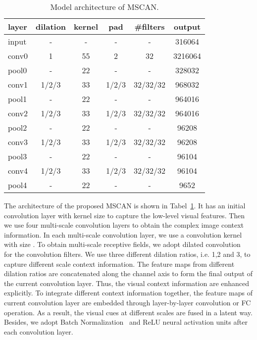\documentclass[10pt,twocolumn,letterpaper]{article}
\begin{document}
\begin{table}[!hbtp]
  \begin{center}
  \scriptsize
    \begin{tabular}{|l|c|c|c|c|c|}
    \hline
    layer & dilation & kernel & pad   & \#filters & output \\
    \hline
    input &    -   &   -    &  -     &   -    & 316064 \\
    \hline
    conv0 & 1     & 55   & 2     & 32    & 3216064 \\
    \hline
    pool0 & -     & 22    & -     & -     & 328032 \\
    \hline
    conv1 & 1/2/3 & 33   & 1/2/3 & 32/32/32 & 968032 \\
    \hline
    pool1 & -     & 22     & -     &    -   & 964016 \\
    \hline
    conv2 & 1/2/3 & 33   & 1/2/3 & 32/32/32 & 964016 \\
    \hline
    pool2 & -     & 22     & -     &    -   & 96208 \\
    \hline
    conv3 & 1/2/3 & 33   & 1/2/3 & 32/32/32 & 96208 \\
    \hline
    pool3 & -     & 22     & -     &    -   & 96104 \\
    \hline
    conv4 & 1/2/3 & 33   & 1/2/3 & 32/32/32 & 96104 \\
    \hline
    pool4 & -     & 22     & -     &    -   & 9652 \\
    \hline
    \end{tabular}\end{center}
  \caption{Model architecture of MSCAN.}
  \label{tab:mscan}\vspace{-1em}
\end{table}

The architecture of the proposed MSCAN is shown in Tabel~\ref{tab:mscan}.
It has an initial convolution layer with kernel size  to capture the low-level visual features.
Then we use four multi-scale convolution layers to obtain the complex image context information.
In each multi-scale convolution layer, we use a convolution kernel with size .
To obtain multi-scale receptive fields, we adopt dilated convolution~\cite{YuKoltun2016} for the convolution filters.
We use three different dilation ratios, i.e. 1,2 and 3, to capture different scale context information.
The feature maps from different dilation ratios are concatenated along the channel axis to form the final output of the current convolution layer.
Thus, the visual context information are enhanced explicitly.
To integrate different context information together, the feature maps of current convolution layer are embedded through layer-by-layer convolution or FC operation.
As a result, the visual cues at different scales are fused in a latent way.
Besides, we adopt Batch Normalization~\cite{Ioffe15batch} and ReLU neural activation units after each convolution layer.
\end{document}
